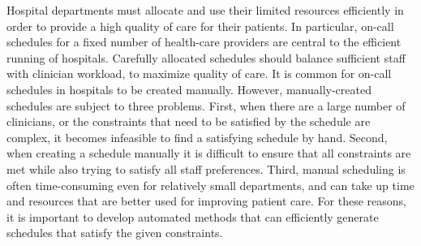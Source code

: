 Hospital departments must allocate and use their limited resources efficiently
in order to provide a high quality of care for their patients.
In particular, on-call schedules for
a fixed number of health-care providers are central to the efficient running of
hospitals. Carefully allocated schedules should balance
sufficient staff with clinician workload,
to maximize quality of care. It is common for on-call schedules in
hospitals to be created manually. However,
manually-created schedules are subject to three problems.
First, when there are a large number of clinicians,
or the constraints that need to be satisfied
by the schedule are complex, it becomes infeasible
to find a satisfying schedule by hand.
Second, when creating a schedule manually it is difficult to ensure
that all constraints are met while also trying to satisfy all staff
preferences.
Third, manual scheduling is often time-consuming even for relatively small 
departments, and can take up time and resources that are better used
for improving patient care.
For these reasons, it is important to develop automated methods that
can efficiently generate schedules that satisfy the given constraints.

